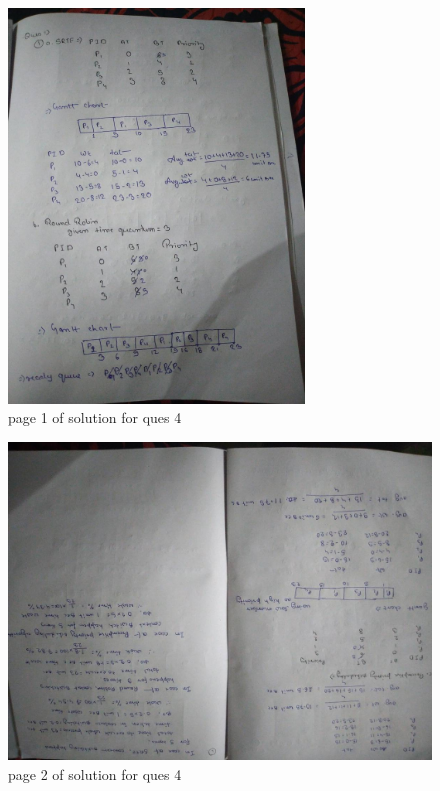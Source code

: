 \documentclass[11pt,a4paper,oneside]{article}
\begin{document}
\begin{figure}[hbt!]
	\centering
	\includegraphics[width=0.7\textwidth, angle=-90]{images/red_images/q4i1.jpg}
	\caption{page 1 of solution for ques 4}
\end{figure}

\begin{figure}[hbt!]
	\centering
	\includegraphics[width=1\textwidth]{images/red_images/q4i2.jpg}
	\caption{page 2 of solution for ques 4}
\end{figure}
\end{document}
